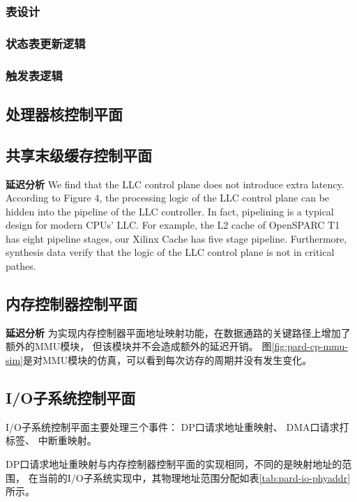 \subsubsection*{表设计}
\subsubsection*{状态表更新逻辑}
\subsubsection*{触发表逻辑}


\subsection{处理器核控制平面}
\label{chap:impl:corecp}

\subsection{共享末级缓存控制平面}
\label{chap:impl:cachecp}


\textbf{延迟分析}\quad
We find that the LLC control plane does not introduce
extra latency. According to Figure 4, the processing logic of the
LLC control plane can be hidden into the pipeline of the LLC
controller. In fact, pipelining is a typical design for modern CPUs’
LLC. For example, the L2 cache of OpenSPARC T1 has eight
pipeline stages, our Xilinx Cache has five stage pipeline.
Furthermore, synthesis data verify that the logic
of the LLC control plane is not in critical pathes.


\subsection{内存控制器控制平面}
\label{chap:impl:migcp}

\textbf{延迟分析}\quad
为实现内存控制器平面地址映射功能，在数据通路的关键路径上增加了额外的MMU模块，
但该模块并不会造成额外的延迟开销。
图\ref{fig:pard-cp-mmu-sim}是对MMU模块的仿真，可以看到每次访存的周期并没有发生变化。


\subsection{I/O子系统控制平面}
\label{chap:impl:iocp}

I/O子系统控制平面主要处理三个事件：
DP口请求地址重映射、
DMA口请求打标签、
中断重映射。

DP口请求地址重映射与内存控制器控制平面的实现相同，不同的是映射地址的范围，
在当前的I/O子系统实现中，其物理地址范围分配如表\ref{tab:pard-io-phyaddr}所示。

